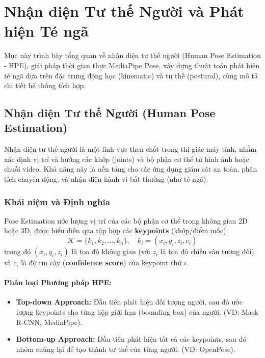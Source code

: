 \section{Nhận diện Tư thế Người và Phát hiện Té ngã}
\label{sec:pose_fall_system}

Mục này trình bày tổng quan về nhận diện tư thế người (Human Pose Estimation - HPE), giải pháp thời gian thực MediaPipe Pose, xây dựng thuật toán phát hiện té ngã dựa trên đặc trưng động học (kinematic) và tư thế (postural), cùng mô tả chi tiết hệ thống tích hợp.

\subsection{Nhận diện Tư thế Người (Human Pose Estimation)}

Nhận diện tư thế người là một lĩnh vực then chốt trong thị giác máy tính, nhằm xác định vị trí và hướng các khớp (joints) và bộ phận cơ thể từ hình ảnh hoặc chuỗi video. Khả năng này là nền tảng cho các ứng dụng giám sát an toàn, phân tích chuyển động, và nhận diện hành vi bất thường (như té ngã).

\subsubsection{Khái niệm và Định nghĩa}

Pose Estimation ước lượng vị trí của các bộ phận cơ thể trong không gian 2D hoặc 3D, được biểu diễn qua tập hợp các \textbf{keypoints} (khớp/điểm mốc):
\begin{equation}
\mathcal{K} = \{k_1, k_2, ..., k_n\}, \quad k_i = (x_i, y_i, z_i, c_i)
\end{equation}
trong đó $(x_i, y_i, z_i)$ là tọa độ không gian (với $z_i$ là tọa độ chiều sâu tương đối) và $c_i$ là độ tin cậy (\textbf{confidence score}) của keypoint thứ $i$.

\paragraph{Phân loại Phương pháp HPE:}
\begin{itemize}
    \item \textbf{Top-down Approach:} Đầu tiên phát hiện đối tượng người, sau đó ước lượng keypoints cho từng hộp giới hạn (bounding box) của người. (VD: Mask R-CNN, MediaPipe).
    \item \textbf{Bottom-up Approach:} Đầu tiên phát hiện tất cả các keypoints, sau đó nhóm chúng lại để tạo thành tư thế của từng người. (VD: OpenPose).
\end{itemize}

